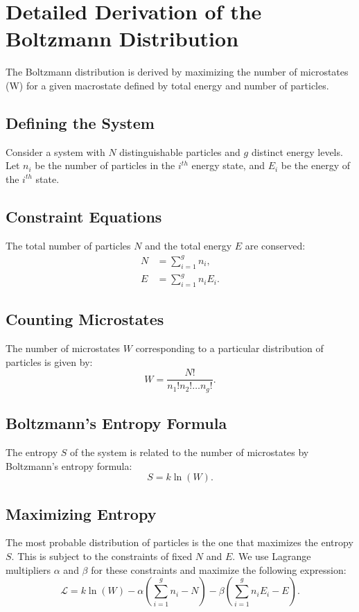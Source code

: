 \documentclass[12pt]{article}
\begin{document}
\section{Detailed Derivation of the Boltzmann Distribution}

The Boltzmann distribution is derived by maximizing the number of microstates (W) for a given macrostate defined by total energy and number of particles.

\subsection{Defining the System}
Consider a system with $N$ distinguishable particles and $g$ distinct energy levels. Let $n_i$ be the number of particles in the $i^{th}$ energy state, and $E_i$ be the energy of the $i^{th}$ state.

\subsection{Constraint Equations}
The total number of particles $N$ and the total energy $E$ are conserved:
\begin{align*}
    N &= \sum_{i=1}^{g} n_i, \\
    E &= \sum_{i=1}^{g} n_i E_i.
\end{align*}

\subsection{Counting Microstates}
The number of microstates $W$ corresponding to a particular distribution of particles is given by:
\begin{equation*}
    W = \frac{N!}{n_1! n_2! \ldots n_g!}.
\end{equation*}

\subsection{Boltzmann's Entropy Formula}
The entropy $S$ of the system is related to the number of microstates by Boltzmann's entropy formula:
\begin{equation*}
    S = k \ln(W).
\end{equation*}

\subsection{Maximizing Entropy}
The most probable distribution of particles is the one that maximizes the entropy $S$. This is subject to the constraints of fixed $N$ and $E$. We use Lagrange multipliers $\alpha$ and $\beta$ for these constraints and maximize the following expression:
\begin{equation*}
    \mathcal{L} = k \ln(W) - \alpha \left( \sum_{i=1}^{g} n_i - N \right) - \beta \left( \sum_{i=1}^{g} n_i E_i - E \right).
\end{equation*}
\end{document}
